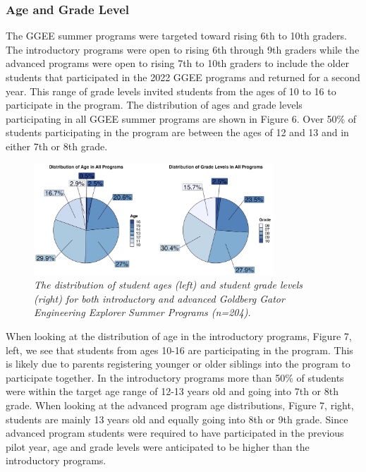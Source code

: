 \documentclass[
]{article}
\begin{document}
\hypertarget{age-and-grade-level}{%
\subsubsection{Age and Grade Level}\label{age-and-grade-level}}

The GGEE summer programs were targeted toward rising 6th to 10th
graders. The introductory programs were open to rising 6th through 9th
graders while the advanced programs were open to rising 7th to 10th
graders to include the older students that participated in the 2022 GGEE
programs and returned for a second year. This range of grade levels
invited students from the ages of 10 to 16 to participate in the
program. The distribution of ages and grade levels participating in all
GGEE summer programs are shown in Figure 6. Over 50\% of students
participating in the program are between the ages of 12 and 13 and in
either 7th or 8th grade.

\begin{figure}
\centering
\includegraphics[width=0.8\textwidth,height=\textheight]{Graphs/Report/GGEE_23_AgeGrade_All.jpg}
\caption{\emph{The distribution of student ages (left) and student grade
levels (right) for both introductory and advanced Goldberg Gator
Engineering Explorer Summer Programs (n=204).}}
\end{figure}

When looking at the distribution of age in the introductory programs,
Figure 7, left, we see that students from ages 10-16 are participating
in the program. This is likely due to parents registering younger or
older siblings into the program to participate together. In the
introductory programs more than 50\% of students were within the target
age range of 12-13 years old and going into 7th or 8th grade. When
looking at the advanced program age distributions, Figure 7, right,
students are mainly 13 years old and equally going into 8th or 9th
grade. Since advanced program students were required to have
participated in the previous pilot year, age and grade levels were
anticipated to be higher than the introductory programs.
\end{document}
